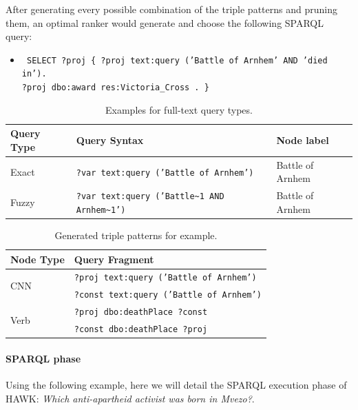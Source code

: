  After generating every possible combination of the triple patterns and pruning them, an optimal ranker would generate and choose the following SPARQL query:
\begin{itemize}
\item \texttt{
SELECT ?proj \{
?proj text:query ('Battle of Arnhem' AND 'died in').\\ 
?proj  dbo:award res:Victoria\_Cross . \}}
\end{itemize}


\begin{table}[htb!]
\centering
\begin{tabular}{l@{\quad}l@{\quad}l}
\toprule
\textbf{Query Type} & \textbf{Query Syntax} & \textbf{Node label}\\
\midrule
Exact & \texttt{?var text:query ('Battle of Arnhem')}  & Battle of Arnhem\\
Fuzzy & \texttt{?var text:query ('Battle\textasciitilde1 AND Arnhem\textasciitilde 1')} & Battle of Arnhem\\
\bottomrule
\end{tabular}
\caption{Examples for full-text query types.}
\label{tab:exact_fuzzy}
\end{table}


\begin{table}[htb!]
\centering
\begin{tabular}{l@{\quad}l}
\toprule
\textbf{Node Type} & \textbf{Query Fragment} \\
\midrule
\multirow{2}{*}{CNN} & \texttt{?proj text:query ('Battle of Arnhem')} \\
& \texttt{?const text:query ('Battle of Arnhem')} \\
\midrule
\multirow{2}{*}{Verb} & \texttt{?proj dbo:deathPlace ?const} \\
 & \texttt{?const dbo:deathPlace ?proj} \\
\bottomrule
\end{tabular}
\caption{Generated triple patterns for  example.}
\label{tab:triple_patterns_example}
\end{table}





\paragraph{SPARQL phase} Using the following  example, here we will detail the SPARQL execution phase of HAWK: \emph{Which anti-apartheid activist was born in Mvezo?}.


